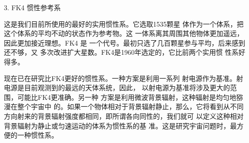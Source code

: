 \textsf{3. FK4 惯性参考系}

这是我们目前所使用的最好的实用惯性系。它选取1535颗星
体作为一个体系，把这个体系的平均不动的状态作为参考物。这
一体系离其周围其他物体更加遥远，因此更加接近理想。FK4
\clearpage\noindent
是
一个代号。最初只选了几百颗星参与平均，后来感到还不够，又
多次改进扩大星数。FK4是1960年选定的，它比前两个实用惯
性系好得多。

现在已在研究比FK4更好的惯性系。一种方案是利用一系列
射电源作为基准。射电源是目前观测到的最远的天体系统，因此，
以射电源为基准将涉及更大的范围，可能比FK4更准确。另一种
方案是利用微波背景辐射，这种辐射是均匀地猕漫在整个宇宙中
的。如果一个物体相对于背景辐射静止，那么，它将看到从不同
方向射来的背景辐射强度都相同，即所谓各向同性的，我们就可
以定义这种相对背景辐射为静止或匀速运动的体系为惯性系的基
准。这是研究宇宙问题时，最方便的一种惯性系。